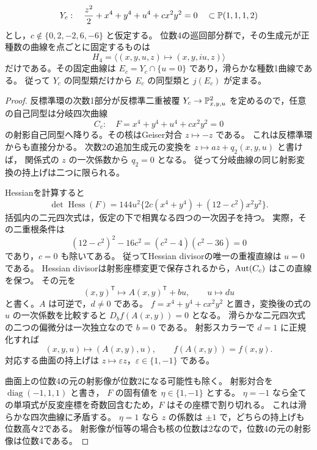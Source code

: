 \begin{proposition}[Ciani曲面の楕円固定部分群]
\label{prop:ku-degree-two-intrinsic-cyclic-group}
\[
 Y_c:\quad \frac{z^2}{2}+x^4+y^4+u^4+cx^2y^2=0
       \quad\subset\mathbb P(1,1,1,2)
\]
とし，$c\notin\{0,2,-2,6,-6\}$ と仮定する。
位数4の巡回部分群で，その生成元が正種数の曲線を点ごとに固定するものは
\[
 H_4=\langle (x,y,u,z)\longmapsto(x,y,iu,z)\rangle
\]
だけである。その固定曲線は $E_c=Y_c\cap\{u=0\}$ であり，滑らかな種数1曲線である。
従って $Y_c$ の同型類だけから $E_c$ の同型類と $j(E_c)$ が定まる。
\end{proposition}
\begin{proof}
反標準環の次数1部分が反標準二重被覆
$Y_c\to\mathbb P^2_{x,y,u}$ を定めるので，任意の自己同型は分岐四次曲線
\[
 C_c:\quad F=x^4+y^4+u^4+cx^2y^2=0
\]
の射影自己同型へ降りる。その核はGeiser対合 $z\mapsto-z$ である。
これは反標準環からも直接分かる。
次数2の追加生成元の変換を $z\mapsto az+q_2(x,y,u)$ と書けば，
関係式の $z$ の一次係数から $q_2=0$ となる。
従って分岐曲線の同じ射影変換の持上げは二つに限られる。

Hessianを計算すると
\begin{equation}\label{eq:ku-ciani-hessian-factorization}
 \det\operatorname{Hess}(F)
 =144u^2\{2c(x^4+y^4)+(12-c^2)x^2y^2\}.
\end{equation}
括弧内の二元四次式は，仮定の下で相異なる四つの一次因子を持つ。
実際，その二重根条件は
\[
 (12-c^2)^2-16c^2=(c^2-4)(c^2-36)=0
\]
であり，$c=0$ も除いてある。
従ってHessian divisorの唯一の重複直線は $u=0$ である。
Hessian divisorは射影座標変更で保存されるから，$\operatorname{Aut}(C_c)$ はこの直線を保つ。
その元を
\[
 (x,y)^{\mathsf T}\longmapsto A(x,y)^{\mathsf T}+bu,
 \qquad u\longmapsto du
\]
と書く。$A$ は可逆で，$d\ne0$ である。
$f=x^4+y^4+cx^2y^2$ と置き，変換後の式の $u$ の一次係数を比較すると
$D_bf(A(x,y))=0$ となる。
滑らかな二元四次式の二つの偏微分は一次独立なので $b=0$ である。
射影スカラーで $d=1$ に正規化すれば
\begin{equation}\label{eq:ku-ciani-base-automorphisms}
 (x,y,u)\longmapsto(A(x,y),u),\qquad f(A(x,y))=f(x,y).
\end{equation}
対応する曲面の持上げは $z\mapsto\varepsilon z$，$\varepsilon\in\{1,-1\}$ である。

曲面上の位数4の元の射影像が位数2になる可能性も除く。
射影対合を $\operatorname{diag}(-1,1,1)$ と書き，
$F$ の固有値を $\eta\in\{1,-1\}$ とする。
$\eta=-1$ なら全ての単項式が反変座標を奇数回含むため，$F$ はその座標で割り切れる。
これは滑らかな四次曲線に矛盾する。
$\eta=1$ なら $z$ の係数は $\pm1$ で，どちらの持上げも位数高々2である。
射影像が恒等の場合も核の位数は2なので，位数4の元の射影像は位数4である。


\end{proof}
